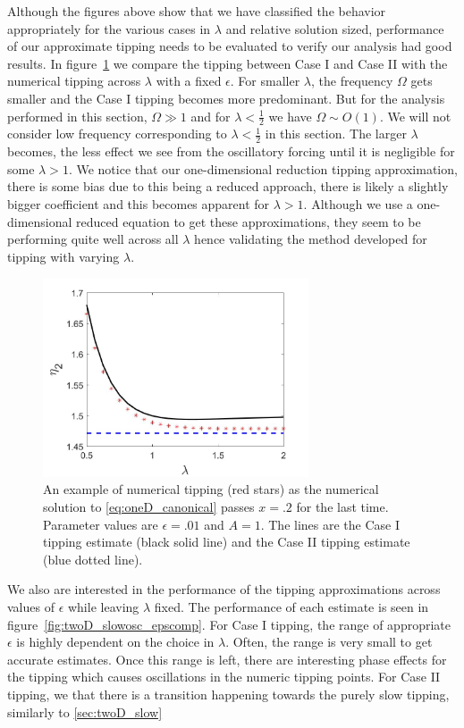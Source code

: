 Although the figures above show that we have classified the behavior appropriately for the various cases in $\lambda$ and relative solution sized, performance of our approximate tipping needs to be evaluated to verify our analysis had good results. In figure~\ref{fig:twoD_slowosc_lambdacomp} we compare the tipping between Case I and Case II with the numerical tipping across $\lambda$ with a fixed $\epsilon$. For smaller $\lambda$, the frequency $\Omega$ gets smaller and the Case I tipping becomes more predominant. But for the analysis performed in this section, $\Omega\gg 1$ and for $\lambda<\frac{1}{2}$ we have $\Omega\sim O(1)$. We will not consider low frequency corresponding to $\lambda<\frac{1}{2}$ in this section. The larger $\lambda$ becomes, the less effect we see from the oscillatory forcing until it is negligible for some $\lambda>1$. We notice that our one-dimensional reduction tipping approximation, there is some bias due to this being a reduced approach, there is likely a slightly bigger coefficient and this becomes apparent for $\lambda>1$. Although we use a one-dimensional reduced equation to get these approximations, they seem to be performing quite well across all $\lambda$ hence validating the method developed for tipping with varying $\lambda$.

\begin{figure}[H]
\centering
\includegraphics[width=0.7\textwidth]{twoD/slowosc_lambdacomp.jpg}
\caption{An example of numerical tipping (red stars) as the numerical solution to \eqref{eq:oneD_canonical} passes $x=.2$ for the last time. Parameter values are $\epsilon=.01$ and $A=1$. The lines are the Case I tipping estimate (black solid line) and the Case II tipping estimate (blue dotted line).}
\label{fig:twoD_slowosc_lambdacomp}
\end{figure} 

We also are interested in the performance of the tipping approximations across values of $\epsilon$ while leaving $\lambda$ fixed. The performance of each estimate is seen in figure~\ref{fig:twoD_slowosc_epscomp}. For Case I tipping, the range of appropriate $\epsilon$ is highly dependent on the choice in $\lambda$. Often, the range is very small to get accurate estimates. Once this range is left, there are interesting phase effects for the tipping which causes oscillations in the numeric tipping points. For Case II tipping, we that there is a transition happening towards the purely slow tipping, similarly to \autoref{sec:twoD_slow}


